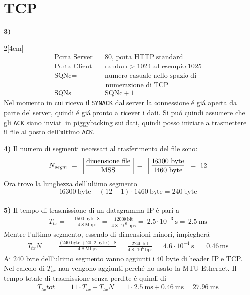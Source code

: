\documentclass{article}
\DeclarePairedDelimiter\ceil{\lceil}{\rceil}
\def\code#1{\texttt{#1}}
\newenvironment{homeworkProblem}[1][-1]{
    \section{TCP}
}{}
\begin{document}
\begin{homeworkProblem}
    \textbf{3)}
    \begin{multicols}{2}[\columnsep4em] 	
		\[
			\begin{split}
            	\text{Porta Server} =&\ 80 \text{, porta HTTP standard}
            	\\
            	\text{Porta Client} =&\ \text{random} > 1024\ \text{ad esempio } 1025
            	\\
            	\text{SQNc} =&\ \text{numero casuale nello spazio di}
           		\\
           		&\text{ numerazione di TCP}
            	\\
            	\text{SQNs} =&\ \text{SQNc} + 1            	
        	\end{split}
		\]
		Nel momento in cui ricevo il \code{SYNACK} dal server la connessione \'e gi\'a aperta da parte del server, quindi 
		\'e gi\'a pronto a ricever i dati.	Si pu\'o quindi assumere che gli \code{ACK} siano inviati in piggybacking sui 
		dati, quindi posso iniziare a trasmettere il file al posto dell'ultimo \code{ACK}.
		
		\columnbreak
	
		
	\end{multicols}    
    
    \pagebreak
    \textbf{4)} 
    Il numero di segmenti necessari al trasferimento del file sono:
    \[
    	N_{segm}\ =\ \ceil*{\frac{\text{dimensione file}}{\text{MSS}}}
    	=\ \ceil*{\frac{16300\ \text{byte}}{1460\ \text{byte}}} =\ 12
    \]
    Ora trovo la lunghezza dell'ultimo segmento
    \[
    	16300\ \text{byte} - (12-1) \cdot 1460\ \text{byte} = 240\ \text{byte}
    \]
    \\    
    
    \textbf{5)}
    Il tempo di trasmissione di un datagramma IP \'e pari a
    \[
    	\begin{split}
    		T_{tx} =&\ \frac{1500\ \text{byte} \cdot 8}{4.8\ \text{Mbps}}
    		=\ \frac{12000\ \text{bit}}{4.8 \cdot 10^6\ \text{bps}}
    		=\ 2.5 \cdot 10^{-3}\ \text{s} =\ 2.5\ \text{ms}
    	\end{split}
    \]
    Mentre l'ultimo segmento, essendo di dimensioni minori, impiegher\'a
    \[
    	\begin{split}
    		T_{tx}N =&\ \frac{(240\ \text{byte} + 20 \cdot 2\ \text{byte}) \cdot 8}{4.8\ \text{Mbps}}
    		=\ \frac{2240\ \text{bit}}{4.8 \cdot 10^6\ \text{bps}}
    		=\ 4.6 \cdot 10^{-4}\ \text{s}\ =\ 0.46\ \text{ms}
    	\end{split}
    \]
    Ai \(240\) byte dell'ultimo segmento vanno aggiunti i \(40\) byte di header IP e TCP. Nel calcolo di \(T_{tx}\) non
    vengono aggiunti perch\'e ho usato la MTU Ethernet. Il tempo totale di trasmissione senza perdite \'e quindi di
    \[
    	\begin{split}
    		T_{tx}tot =&\ 11 \cdot T_{tx} + T_{tx}N = 11 \cdot 2.5\ \text{ms} + 0.46\ \text{ms} = 27.96\ \text{ms}
    	\end{split}
    \]
    

\end{homeworkProblem}
\end{document}
